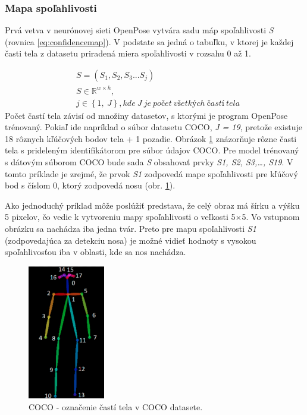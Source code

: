\documentclass[slovak,master,dept460,male,cpp,cpdeclaration]{diploma}
\begin{document}
\subsubsection{Mapa spoľahlivosti}
Prvá vetva v neurónovej sieti OpenPose vytvára sadu máp spoľahlivosti \textit{S} (rovnica \ref{eq:confidencemap}). V podstate sa jedná o tabuľku, v ktorej je každej časti tela z datasetu priradená miera spoľahlivosti v rozsahu 0 až 1. 

\begin{eqnarray}
& S = (S_{1}, S_{2}, S_{3} ... S_{j}) \label{eq:confidencemap}\\
& S\in\mathbb{R}^{w \times  h},\nonumber\\
& j\in \left \{1,\: J  \right \}, kde\: J\: je\: počet\: všetkých\: častí\: tela\nonumber
\end{eqnarray}
Počet častí tela závisí od množiny datasetov, s ktorými je program OpenPose trénovaný. Pokiaľ ide napríklad o súbor datasetu COCO\cite{lin2014microsoft}, \textit{J = 19}, pretože existuje 18 rôznych kľúčových bodov tela + 1 pozadie. Obrázok \ref{fig:cocoDataset} znázorňuje rôzne časti tela s prideleným identifikátorom pre súbor údajov COCO. Pre model trénovaný s dátovým súborom COCO bude sada \textit{S} obsahovať prvky \textit{S1, S2, S3,…, S19}. V tomto príklade je zrejmé, že prvok \textit{S1} zodpovedá mape spoľahlivosti pre kľúčový bod s číslom 0, ktorý zodpovedá nosu (obr. \ref{fig:cocoDataset}).\par
Ako jednoduchý príklad môže poslúžiť predstava, že celý obraz má šírku a výšku 5 pixelov, čo vedie k vytvoreniu  mapy spoľahlivosti o veľkosti 5$\times$5. Vo vstupnom obrázku sa nachádza iba jedna tvár. Preto pre mapu spoľahlivosti \textit{S1} (zodpovedajúca za detekciu nosa) je možné vidieť hodnoty s vysokou spoľahlivosťou iba v oblasti, kde sa nos nachádza.\bigskip

\begin{figure}[H]
	\centering
	\includegraphics[width=0.3\textwidth]{Figures/cocoDataset.png}
	\caption{COCO - označenie častí tela v COCO datasete.\cite{cocoDataset}}
	\label{fig:cocoDataset}
\end{figure}
\end{document}
